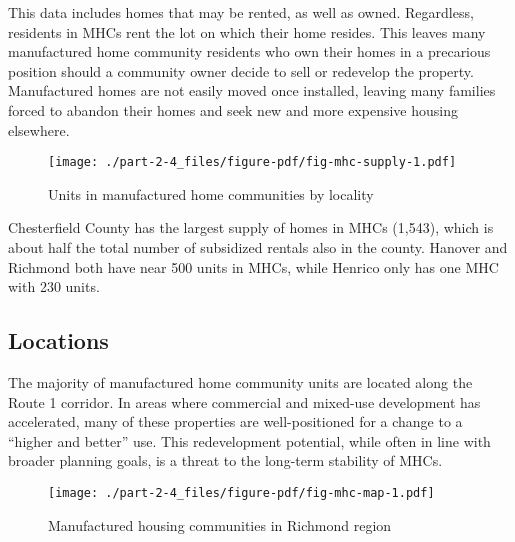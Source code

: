 \documentclass[
  letterpaper,
  DIV=11,
  numbers=noendperiod]{scrreprt}
\begin{document}
\begin{tcolorbox}[enhanced jigsaw, colframe=quarto-callout-note-color-frame, arc=.35mm, bottomrule=.15mm, colbacktitle=quarto-callout-note-color!10!white, opacityback=0, left=2mm, rightrule=.15mm, title=\textcolor{quarto-callout-note-color}{\faInfo}\hspace{0.5em}{Note}, colback=white, coltitle=black, toptitle=1mm, leftrule=.75mm, titlerule=0mm, breakable, opacitybacktitle=0.6, toprule=.15mm, bottomtitle=1mm]

This data includes homes that may be rented, as well as owned.
Regardless, residents in MHCs rent the lot on which their home resides.
This leaves many manufactured home community residents who own their
homes in a precarious position should a community owner decide to sell
or redevelop the property. Manufactured homes are not easily moved once
installed, leaving many families forced to abandon their homes and seek
new and more expensive housing elsewhere.

\end{tcolorbox}

\begin{figure}

{\centering \texttt{[image: ./part-2-4\_files/figure-pdf/fig-mhc-supply-1.pdf]}

}

\caption{\label{fig-mhc-supply}Units in manufactured home communities by
locality}

\end{figure}

Chesterfield County has the largest supply of homes in MHCs (1,543),
which is about half the total number of subsidized rentals also in the
county. Hanover and Richmond both have near 500 units in MHCs, while
Henrico only has one MHC with 230 units.

\hypertarget{locations-2}{%
\subsection{Locations}\label{locations-2}}

The majority of manufactured home community units are located along the
Route 1 corridor. In areas where commercial and mixed-use development
has accelerated, many of these properties are well-positioned for a
change to a ``higher and better'' use. This redevelopment potential,
while often in line with broader planning goals, is a threat to the
long-term stability of MHCs.

\begin{figure}

{\centering \texttt{[image: ./part-2-4\_files/figure-pdf/fig-mhc-map-1.pdf]}

}

\caption{\label{fig-mhc-map}Manufactured housing communities in Richmond
region}

\end{figure}
\end{document}
